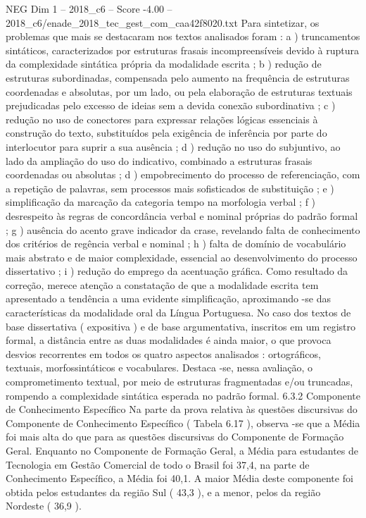 \begin{textsample}{NEG Dim 1 – 2018\_c6 – Score -4.00 – 2018\_c6/enade\_2018\_tec\_gest\_com\_caa42f8020.txt}
Para sintetizar, os problemas que mais se destacaram nos textos analisados foram : a ) truncamentos sintáticos, caracterizados por estruturas frasais incompreensíveis devido à ruptura da complexidade sintática própria da modalidade escrita ; b ) redução de estruturas subordinadas, compensada pelo aumento na frequência de estruturas coordenadas e absolutas, por um lado, ou pela elaboração de estruturas textuais prejudicadas pelo excesso de ideias sem a devida conexão subordinativa ; c ) redução no uso de conectores para expressar relações lógicas essenciais à construção do texto, substituídos pela exigência de inferência por parte do interlocutor para suprir a sua ausência ; d ) redução no uso do subjuntivo, ao lado da ampliação do uso do indicativo, combinado a estruturas frasais coordenadas ou absolutas ; d ) empobrecimento do processo de referenciação, com a repetição de palavras, sem processos mais sofisticados de substituição ; e ) simplificação da marcação da categoria tempo na morfologia verbal ; f ) desrespeito às regras de concordância verbal e nominal próprias do padrão formal ; g ) ausência do acento grave indicador da crase, revelando falta de conhecimento dos critérios de regência verbal e nominal ; h ) falta de domínio de vocabulário mais abstrato e de maior complexidade, essencial ao desenvolvimento do processo dissertativo ; i ) redução do emprego da acentuação gráfica.
Como resultado da correção, merece atenção a constatação de que a modalidade escrita tem apresentado a tendência a uma evidente simplificação, aproximando -se das características da modalidade oral da Língua Portuguesa.
No caso dos textos de base dissertativa ( expositiva ) e de base argumentativa, inscritos em um registro formal, a distância entre as duas modalidades é ainda maior, o que provoca desvios recorrentes em todos os quatro aspectos analisados : ortográficos, textuais, morfossintáticos e vocabulares.
Destaca -se, nessa avaliação, o comprometimento textual, por meio de estruturas fragmentadas e/ou truncadas, rompendo a complexidade sintática esperada no padrão formal. 6.3.2 Componente de Conhecimento Específico Na parte da prova relativa às questões discursivas do Componente de Conhecimento Específico ( Tabela 6.17 ), observa -se que a Média foi mais alta do que para as questões discursivas do Componente de Formação Geral.
Enquanto no Componente de Formação Geral, a Média para estudantes de Tecnologia em Gestão Comercial de todo o Brasil foi 37,4, na parte de Conhecimento Específico, a Média foi 40,1.
A maior Média deste componente foi obtida pelos estudantes da região Sul ( 43,3 ), e a menor, pelos da região Nordeste ( 36,9 ).

\end{textsample}
